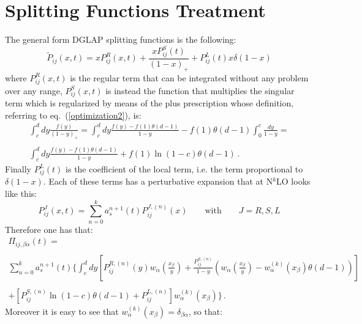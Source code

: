 \documentclass[10pt,a4paper]{article}
\begin{document}
\section{Splitting Functions Treatment}

The general form DGLAP splitting functions is the following:
\begin{equation}
\tilde{P}_{ij}(x,t) = xP_{ij}^{R}(x,t) + \frac{xP_{ij}^{S}(t)}{(1-x)_+} + P_{ij}^{L}(t)x\delta(1-x)
\end{equation}
where $P_{ij}^{R}(x,t)$ is the regular term that can be integrated without any problem over any range, $P_{ij}^{S}(x,t)$ is instead the function that multiplies the singular term which is regularized by means of the plus prescription whose definition, referring to eq.~(\ref{optimization2}), is:
\begin{equation}
\begin{array}{c}
\displaystyle \int_c^d dy \frac{f(y)}{(1-y)_+} = \int_c^d dy \frac{f(y) - f(1)\theta(d-1)}{1-y} - f(1)\theta(d-1)\int_0^c \frac{dy}{1-y} = \\
\\
\displaystyle \int_c^d dy \frac{f(y) - f(1)\theta(d-1)}{1-y} + f(1)\ln(1-c)\theta(d-1)\,.
\end{array}
\end{equation}
Finally $P_{ij}^{L}(t)$ is the coefficient of the local term, i.e. the term proportional to $\delta(1-x)$. Each of these terms has a perturbative expansion that at N$^k$LO looks like this:
\begin{equation}
P_{ij}^{J}(x,t) = \sum_{n=0}^{k}a_s^{n+1}(t)P_{ij}^{J,(n)}(x)\qquad\mbox{with}\qquad J=R,S,L
\end{equation}
Therefore one has that:
\begin{equation}
\begin{array}{c}
\displaystyle \Pi_{ij,\beta\alpha}(t) = \\
\\
\displaystyle \sum_{n=0}^{k} a_s^{n+1}(t) \bigg\{\int^{d}_{c}dy\left[{P}_{ij}^{R,(n)}(y)w_{\alpha}\left(\frac{x_\beta}{y}\right)+\frac{{P}_{ij}^{S,(n)}}{1-y}\left(w_{\alpha}\left(\frac{x_\beta}{y}\right)-w_{\alpha}^{(k)}(x_\beta)\theta(d-1)\right)\right]\\
\\
\displaystyle +\left[{P}_{ij}^{S,(n)}\ln(1-c)\theta(d-1)+{P}_{ij}^{L,(n)}\right]w_{\alpha}^{(k)}(x_\beta)\bigg\}\,.
\end{array}
\end{equation}
Moreover it is easy to see that $w_{\alpha}^{(k)}(x_\beta)=\delta_{\beta\alpha}$, so that:
\end{document}
